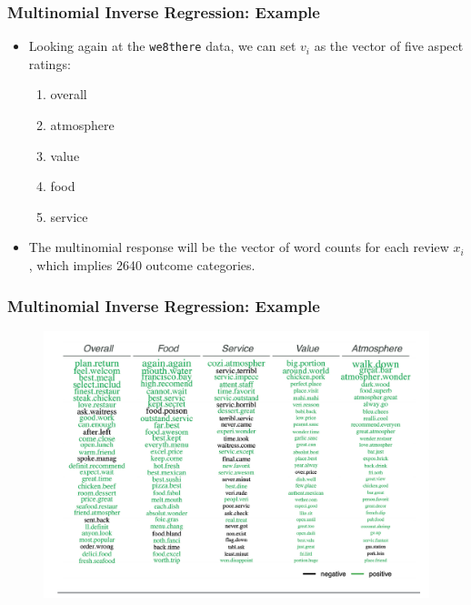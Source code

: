 \documentclass[
  shownotes,
  xcolor={svgnames},
  hyperref={colorlinks,citecolor=DarkBlue,linkcolor=DarkRed,urlcolor=DarkBlue}
  , aspectratio=169]{beamer}
\begin{document}
\begin{frame}
\frametitle{Multinomial Inverse Regression: Example}

\begin{itemize}
\item Looking again at the  \texttt{we8there} data, we can set $v_i$ as the vector of five aspect ratings: 

\begin{enumerate}
  \item overall
  \item atmosphere
  \item value
  \item food 
  \item service
\end{enumerate}
\medskip
\item The multinomial response will be the vector of word counts for each review $x_i$, which implies 2640 outcome categories.

  \end{itemize}



\end{frame}

\begin{frame}
\frametitle{Multinomial Inverse Regression: Example}

\begin{figure}[H] \centering
            \captionsetup{justification=centering}
              \includegraphics[scale=0.5]{figures/MNIR_regression.png}
              
 \end{figure}

\end{frame}
\end{document}

